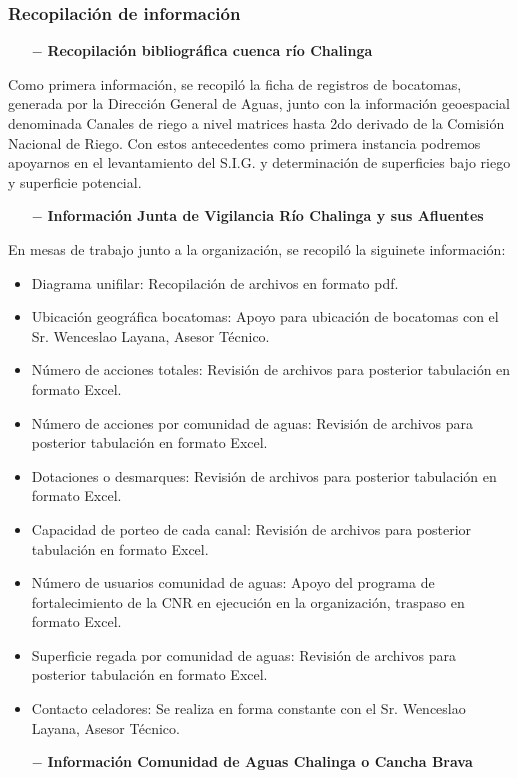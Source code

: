 \documentclass[]{article}
\begin{document}
\subsubsection{Recopilación de información}

\begin{itemize}
	\item[$-$] \textbf{Recopilación bibliográfica cuenca río Chalinga}
\end{itemize}

Como primera información, se recopiló la ficha de registros de bocatomas, generada por la Dirección General de Aguas, junto con la información geoespacial denominada Canales de riego a nivel matrices hasta 2do derivado de la Comisión Nacional de Riego. Con estos antecedentes como primera instancia podremos apoyarnos en el levantamiento del S.I.G. y determinación de superficies bajo riego y superficie potencial.

\begin{itemize}
	\item[$-$] \textbf{Información Junta de Vigilancia Río Chalinga y sus Afluentes}
\end{itemize}

En mesas de trabajo junto a la organización, se recopiló la siguinete información:

\begin{itemize}	
	\item Diagrama unifilar: Recopilación de archivos en formato pdf.
	\item Ubicación geográfica bocatomas: Apoyo para ubicación de bocatomas con el Sr. Wenceslao Layana, Asesor Técnico.
	\item Número de acciones totales: Revisión de archivos para posterior tabulación en formato Excel.
	\item Número de acciones por comunidad de aguas: Revisión de archivos para posterior tabulación en formato Excel.
	\item Dotaciones o desmarques: Revisión de archivos para posterior tabulación en formato Excel.
	\item Capacidad de porteo de cada canal: Revisión de archivos para posterior tabulación en formato Excel.
	\item Número de usuarios comunidad de aguas: Apoyo del programa de fortalecimiento de la CNR en ejecución en la organización, traspaso en formato Excel.
	\item Superficie regada por comunidad de aguas: Revisión de archivos para posterior tabulación en formato Excel.
	\item Contacto celadores: Se realiza en forma constante con el Sr. Wenceslao Layana, Asesor Técnico.
\end{itemize}
\clearpage
\begin{itemize}
	\item[$-$] \textbf{Información Comunidad de Aguas Chalinga o Cancha Brava}
\end{itemize}
\end{document}
